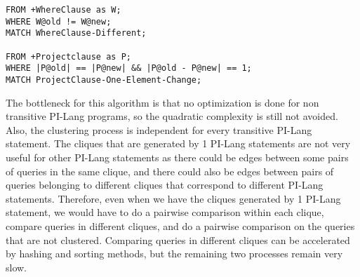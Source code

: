 













%
%


\begin{verbatim}
FROM +WhereClause as W;
WHERE W@old != W@new;
MATCH WhereClause-Different;

FROM +Projectclause as P;
WHERE |P@old| == |P@new| && |P@old - P@new| == 1;
MATCH ProjectClause-One-Element-Change;
\end{verbatim}

The bottleneck for this algorithm is that no optimization is done for non transitive PI-Lang programs, so the quadratic complexity is still not avoided. Also, the clustering process is independent for every transitive PI-Lang statement. The cliques that are generated by 1 PI-Lang statements are not very useful for other PI-Lang statements as there could be edges between some pairs of queries in the same clique, and there could also be edges between pairs of queries belonging to different cliques that correspond to different PI-Lang statements. Therefore, even when we have the cliques generated by 1 PI-Lang statement, we would have to do a pairwise comparison within each clique, compare queries in different cliques, and do a pairwise comparison on the queries that are not clustered. Comparing queries in different cliques can be accelerated by hashing and sorting methods, but the remaining two processes remain very slow. \\\\



